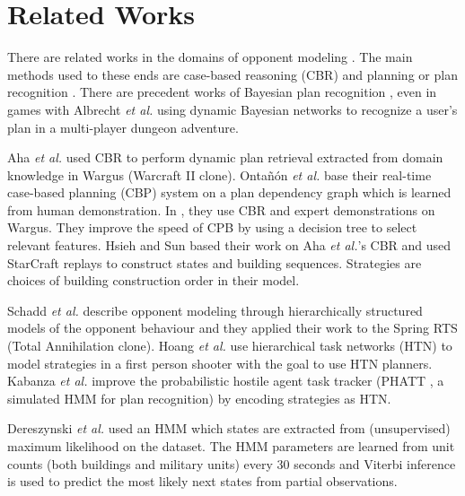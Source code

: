 \section{Related Works}

\citep{Weber2010qf} 

There are related works in the domains of opponent modeling \citep{HsiehS08,schadd2007opponent,OBRecog}. The main methods used to these ends are case-based reasoning (CBR) and planning or plan recognition \citep{LTW,CBR_Planning,OntanonCBR,HTNPlanning,Ramirez}. There are precedent works of Bayesian plan recognition \citep{BMPR}, even in games with Albrecht \textit{et al.} \citep{BayesianRecog} using dynamic Bayesian networks to recognize a user's plan in a multi-player dungeon adventure. 

Aha \textit{et al.} \citep{LTW} used CBR to perform dynamic plan retrieval extracted from domain knowledge in Wargus (Warcraft II clone). Onta\~{n}\'{o}n \textit{et al.} \citep{CBR_Planning} base their real-time case-based planning (CBP) system on a plan dependency graph which is learned from human demonstration. In \citep{OntanonCBR,PlanRetrieval}, they use CBR and expert demonstrations on Wargus. %
They improve the speed of CPB by using a decision tree to select relevant features. Hsieh and Sun \citep{HsiehS08} based their work on Aha \textit{et al.}'s CBR \citep{LTW} and used StarCraft replays to construct states and building sequences. Strategies are choices of building construction order in their model. 

Schadd \textit{et al.} \citep{schadd2007opponent} describe opponent modeling through hierarchically structured models of the opponent behaviour and they applied their work to the Spring RTS (Total Annihilation clone). Hoang \textit{et al.} \citep{HTNPlanning} use hierarchical task networks (HTN) to model strategies in a first person shooter with the goal to use HTN planners. Kabanza \textit{et al.} \citep{OBRecog} improve the probabilistic hostile agent task tracker (PHATT \citep{PHATT}, a simulated HMM for plan recognition) by encoding strategies as HTN. 

Dereszynski \textit{et al.} \citep{HMMstrat_RTS_AIIDE11} used an HMM which states are extracted from (unsupervised) maximum likelihood on the dataset. The HMM parameters are learned from unit counts (both buildings and military units) every 30 seconds and Viterbi inference is used to predict the most likely next states from partial observations. %


